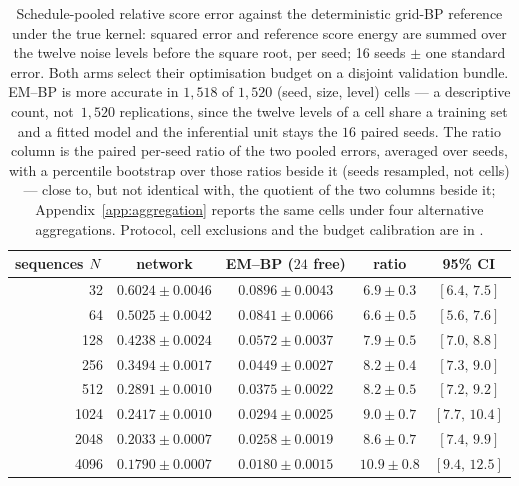 
\begin{table}[!htbp]
\caption[Relative denoising error against training-set size]{Schedule-pooled relative score error against the deterministic grid-BP
reference under the true kernel: squared error and reference score energy are summed over the
twelve noise levels before the square root, per seed; 16 seeds $\pm$ one standard error.
Both arms select their optimisation budget on a disjoint validation bundle. EM--BP is
more accurate in $1{,}518$ of $1{,}520$ (seed, size, level) cells --- a
descriptive count, not $\,1{,}520$ replications, since the twelve levels of a
cell share a training set and a fitted model and the inferential unit stays the
$16$ paired seeds. The ratio
column is the paired per-seed ratio of the two pooled errors, averaged over seeds,
with a percentile bootstrap over those ratios beside it (seeds resampled, not
cells) --- close to, but
not identical with, the quotient of the two columns beside it;
Appendix~\ref{app:aggregation} reports the same cells under four alternative aggregations.
Protocol, cell exclusions and the budget calibration are in \provenanceappendix.}
\label{tab:pointwise}
\centering
\setlength{\tabcolsep}{4pt}
\begin{tabular}{rcccc}
\toprule
sequences $N$ & network & EM--BP ($24$ free) & ratio & 95\% CI \\
\midrule
32   & $0.6024 \pm 0.0046$ & $\mathbf{0.0896 \pm 0.0043}$ & $6.9 \pm 0.3$ & $[6.4,\, 7.5]$ \\
64   & $0.5025 \pm 0.0042$ & $\mathbf{0.0841 \pm 0.0066}$ & $6.6 \pm 0.5$ & $[5.6,\, 7.6]$ \\
128  & $0.4238 \pm 0.0024$ & $\mathbf{0.0572 \pm 0.0037}$ & $7.9 \pm 0.5$ & $[7.0,\, 8.8]$ \\
256  & $0.3494 \pm 0.0017$ & $\mathbf{0.0449 \pm 0.0027}$ & $8.2 \pm 0.4$ & $[7.3,\, 9.0]$ \\
512  & $0.2891 \pm 0.0010$ & $\mathbf{0.0375 \pm 0.0022}$ & $8.2 \pm 0.5$ & $[7.2,\, 9.2]$ \\
1024 & $0.2417 \pm 0.0010$ & $\mathbf{0.0294 \pm 0.0025}$ & $9.0 \pm 0.7$ & $[7.7,\, 10.4]$ \\
2048 & $0.2033 \pm 0.0007$ & $\mathbf{0.0258 \pm 0.0019}$ & $8.6 \pm 0.7$ & $[7.4,\, 9.9]$ \\
4096 & $0.1790 \pm 0.0007$ & $\mathbf{0.0180 \pm 0.0015}$ & $10.9 \pm 0.8$ & $[9.4,\, 12.5]$ \\
\bottomrule
\end{tabular}
\end{table}
